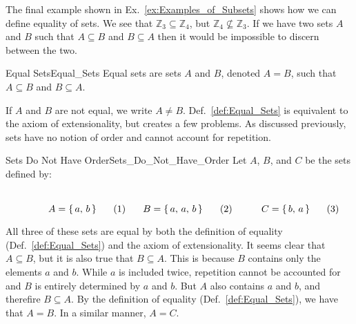         The final example shown in Ex.~\ref{ex:Examples_of_Subsets}
        shows how we can define equality of sets. We see that
        $\mathbb{Z}_{3}\subseteq\mathbb{Z}_{4}$, but
        $\mathbb{Z}_{4}\nsubseteq\mathbb{Z}_{3}$. If we have two sets
        $A$ and $B$ such that $A\subseteq{B}$ and $B\subseteq{A}$ then
        it would be impossible to discern between the two.
        \begin{fdefinition}{Equal Sets}{Equal_Sets}
            Equal sets are sets $A$ and $B$, denoted $A=B$, such that
            $A\subseteq{B}$ and $B\subseteq{A}$.
        \end{fdefinition}
        If $A$ and $B$ are not equal, we write $A\ne{B}$.
        Def.~\ref{def:Equal_Sets} is equivalent to the axiom of
        extensionality, but creates a few problems. As discussed
        previously, sets have no notion of order and cannot account
        for repetition.
        \begin{fexample}{Sets Do Not Have Order}{Sets_Do_Not_Have_Order}
            Let $A$, $B$, and $C$ be the sets defined by:
            \par
            \begin{subequations}
                \begin{minipage}[b]{0.32\textwidth}
                    \begin{equation}
                        A=\{\,a,\,b\,\}
                    \end{equation}
                \end{minipage}
                \hfill
                \begin{minipage}[b]{0.32\textwidth}
                    \begin{equation}
                        B=\{\,a,\,a,\,b\,\}
                    \end{equation}
                \end{minipage}
                \hfill
                \begin{minipage}[b]{0.32\textwidth}
                    \begin{equation}
                        C=\{\,b,\,a\,\}
                    \end{equation}
                \end{minipage}
            \end{subequations}
            \par\vspace{2.5ex}
            All three of these sets are equal by both the definition of
            equality (Def.~\ref{def:Equal_Sets}) and the axiom of
            extensionality. It seems clear that $A\subseteq{B}$, but it is
            also true that $B\subseteq{A}$. This is because $B$ contains only
            the elements $a$ and $b$. While $a$ is included twice,
            repetition cannot be accounted for and $B$ is entirely
            determined by $a$ and $b$. But $A$ also contains $a$ and $b$, and
            therefire $B\subseteq{A}$. By the definition of equality
            (Def.~\ref{def:Equal_Sets}), we have that $A=B$. In a similar
            manner, $A=C$.
        \end{fexample}
